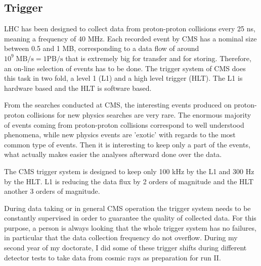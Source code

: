 %
%
%
\subsection{Trigger}
\label{sec:trigger}

LHC has been designed to collect data from proton-proton collisions every 25 ns, meaning a frequency of 40 MHz. Each recorded event by CMS has a nominal size between 0.5 and 1 MB, corresponding to a data flow of around $10^{9}\; \text{MB/s}= 1\text{PB/s}$ that is extremely big for transfer and for storing. Therefore, an on-line selection of events has to be done. The trigger system of CMS does this task in two fold, a level 1 (L1) and a high level trigger (HLT). The L1 is hardware based and the HLT is software based. 

From the searches conducted at CMS, the interesting events produced on proton-proton collisions for new physics searches are very rare. The enormous majority of events coming from proton-proton collisions correspond to well understood phenomena, while new physics events are 'exotic' with regards to the most common type of events. Then it is interesting to keep only a part of the events, what actually makes easier the analyses afterward done over the data. 

The CMS trigger system is designed to keep only 100 kHz by the L1 and 300 Hz by the HLT. L1 is reducing the data flux by 2 orders of magnitude and the HLT another 3 orders of magnitude.

During data taking or in general CMS operation the trigger system needs to be constantly supervised in order to guarantee the quality of collected data. For this purpose, a person is always looking that the whole trigger system has no failures, in particular that the data collection frequency do not overflow. During my second year of my doctorate, I did some of these trigger shifts during different detector tests to take data from cosmic rays as preparation for run II. %

